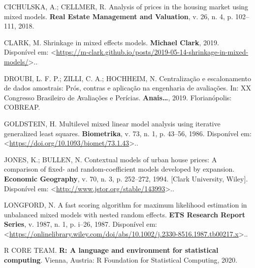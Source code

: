 \documentclass[
  a4paper, 11pt]{article}
\begin{document}
\leavevmode\hypertarget{ref-polonia}{}%
CICHULSKA, A.; CELLMER, R. Analysis of prices in the housing market
using mixed models. \textbf{Real Estate Management and Valuation}, v.
26, n. 4, p. 102--111, 2018.

\leavevmode\hypertarget{ref-clark2019shrinkage}{}%
CLARK, M. Shrinkage in mixed effects models. \textbf{Michael Clark},
2019. Disponível em:
\textless{}\url{https://m-clark.github.io/posts/2019-05-14-shrinkage-in-mixed-models/}\textgreater..

\leavevmode\hypertarget{ref-droubi2019}{}%
DROUBI, L. F. P.; ZILLI, C. A.; HOCHHEIM, N. Centralização e
escalonamento de dados amostrais: Prós, contras e aplicação na
engenharia de avaliações. In: XX Congresso Brasileiro de Avaliações e
Perícias. \textbf{Anais\ldots{}}, 2019. Florianópolis: COBREAP.

\leavevmode\hypertarget{ref-goldstein}{}%
GOLDSTEIN, H. Multilevel mixed linear model analysis using iterative
generalized least squares. \textbf{Biometrika}, v. 73, n. 1, p. 43--56,
1986. Disponível em:
\textless{}\url{https://doi.org/10.1093/biomet/73.1.43}\textgreater..

\leavevmode\hypertarget{ref-jones1994}{}%
JONES, K.; BULLEN, N. Contextual models of urban house prices: A
comparison of fixed- and random-coefficient models developed by
expansion. \textbf{Economic Geography}, v. 70, n. 3, p. 252--272, 1994.
{[}Clark University, Wiley{]}. Disponível em:
\textless{}\url{http://www.jstor.org/stable/143993}\textgreater..

\leavevmode\hypertarget{ref-longford}{}%
LONGFORD, N. A fast scoring algorithm for maximum likelihood estimation
in unbalanced mixed models with nested random effects. \textbf{ETS
Research Report Series}, v. 1987, n. 1, p. i--26, 1987. Disponível em:
\textless{}\url{https://onlinelibrary.wiley.com/doi/abs/10.1002/j.2330-8516.1987.tb00217.x}\textgreater..

\leavevmode\hypertarget{ref-R}{}%
R CORE TEAM. \textbf{R: A language and environment for statistical
computing}. Vienna, Austria: R Foundation for Statistical Computing,
2020.
\end{document}
